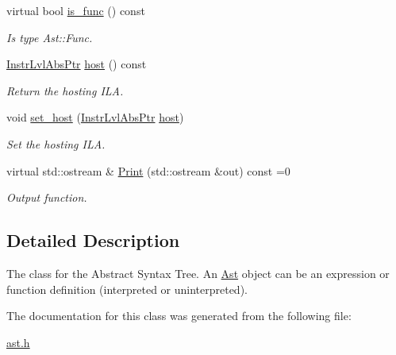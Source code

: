 \begin{DoxyCompactItemize}
\mbox{\label{classilang_1_1_ast_a3e62a4b82a325341a7933649375b63ef}} 
virtual bool \mbox{\hyperlink{classilang_1_1_ast_a3e62a4b82a325341a7933649375b63ef}{is\+\_\+func}} () const
\begin{DoxyCompactList}\small\item\em Is type Ast\+::\+Func. \end{DoxyCompactList}\item 
\mbox{\label{classilang_1_1_ast_a533dd9faf9db1cb76e479c1cacdde285}} 
\mbox{\hyperlink{classilang_1_1_ast_a7433a1e6c865c5c7f64eb7bceca11ec2}{Instr\+Lvl\+Abs\+Ptr}} \mbox{\hyperlink{classilang_1_1_ast_a533dd9faf9db1cb76e479c1cacdde285}{host}} () const
\begin{DoxyCompactList}\small\item\em Return the hosting I\+LA. \end{DoxyCompactList}\item 
\mbox{\label{classilang_1_1_ast_a5f6ec0aef013e95d4798500b9d6058dd}} 
void \mbox{\hyperlink{classilang_1_1_ast_a5f6ec0aef013e95d4798500b9d6058dd}{set\+\_\+host}} (\mbox{\hyperlink{classilang_1_1_ast_a7433a1e6c865c5c7f64eb7bceca11ec2}{Instr\+Lvl\+Abs\+Ptr}} \mbox{\hyperlink{classilang_1_1_ast_a533dd9faf9db1cb76e479c1cacdde285}{host}})
\begin{DoxyCompactList}\small\item\em Set the hosting I\+LA. \end{DoxyCompactList}\item 
\mbox{\label{classilang_1_1_ast_ac28b7b1df94499cbdecf82a9557c7689}} 
virtual std\+::ostream \& \mbox{\hyperlink{classilang_1_1_ast_ac28b7b1df94499cbdecf82a9557c7689}{Print}} (std\+::ostream \&out) const =0
\begin{DoxyCompactList}\small\item\em Output function. \end{DoxyCompactList}\end{DoxyCompactItemize}


\subsection{Detailed Description}
The class for the Abstract Syntax Tree. An \mbox{\hyperlink{classilang_1_1_ast}{Ast}} object can be an expression or function definition (interpreted or uninterpreted). 

The documentation for this class was generated from the following file\+:\begin{DoxyCompactItemize}
\item 
\mbox{\hyperlink{ast_8h}{ast.\+h}}\end{DoxyCompactItemize}

